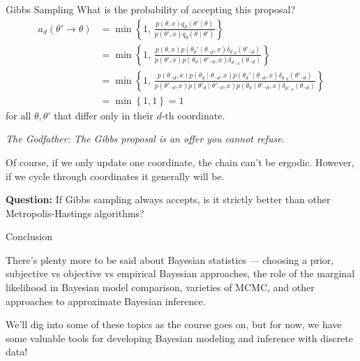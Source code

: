 \documentclass[aspectratio=169]{beamer}
\begin{document}
\begin{frame}[t,allowframebreaks]{Gibbs Sampling}
What is the probability of accepting this proposal? \begin{align*}
a_d(\theta' \to \theta) 
&= \min \left\{ 1, \, \frac{p(\theta, x) q_d(\theta' \mid \theta)}{p(\theta', x) q_d(\theta \mid \theta')} \right\} \\
&= \min \left\{ 1, \, \frac{p(\theta, x) p(\theta_d' \mid \theta_{\neg d}, x) \delta_{\theta_{\neg d}}(\theta'_{\neg d})}{p(\theta', x) p(\theta_d \mid \theta'_{\neg d}, x) \delta_{\theta'_{\neg d}}(\theta_{\neg d})} \right\} \\
&= \min \left\{ 1, \, \frac{p(\theta_{\neg d}, x) p(\theta_d \mid \theta_{\neg d}, x) p(\theta_d' \mid \theta_{\neg d}, x) \delta_{\theta_{\neg d}}(\theta'_{\neg d})}{p(\theta'_{\neg d}, x) p(\theta'_d \mid \theta'_{\neg d}, x) p(\theta_d \mid \theta'_{\neg d}, x) \delta_{\theta'_{\neg d}}(\theta_{\neg d})} \right\} \\
&= \min \left\{1, 1 \right\} = 1
\end{align*} for all \(\theta, \theta'\) that differ only in their
\(d\)-th coordinate.

\textit{The Godfather: The Gibbs proposal is an offer you cannot refuse.}


Of course, if we only update one coordinate, the chain can't be ergodic.
However, if we cycle through coordinates it generally will be.

\textbf{Question:} If Gibbs sampling always accepts, is it strictly
better than other Metropolis-Hastings algorithms?

\end{frame}

\begin{frame}[t,allowframebreaks]{Conclusion}\label{conclusion}

There's plenty more to be said about Bayesian statistics --- choosing a
prior, subjective vs objective vs empirical Bayesian approaches, the
role of the marginal likelihood in Bayesian model comparison, varieties
of MCMC, and other approaches to approximate Bayesian inference. 

We'll dig into some of these topics as the course goes on, but for now, we
have some valuable tools for developing Bayesian modeling and inference
with discrete data!

\end{frame}
    
\end{document}
